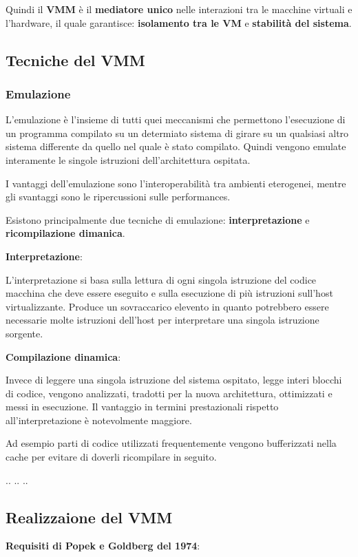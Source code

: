 \documentclass{article}
\begin{document}
Quindi il \textbf{VMM} è il \textbf{mediatore unico} nelle interazioni tra le macchine virtuali e
l'hardware, il quale garantisce: \textbf{isolamento tra le VM} e \textbf{stabilità del sistema}.

\subsection{Tecniche del VMM}
\subsubsection{Emulazione}
L'emulazione è l'insieme di tutti quei meccanismi che permettono l'esecuzione di un programma compilato su un determiato sistema di girare su un qualsiasi altro sistema differente da quello nel quale è stato compilato.
Quindi vengono emulate interamente le singole istruzioni dell'architettura ospitata.

I vantaggi dell'emulazione sono l'interoperabilità tra ambienti eterogenei, mentre gli svantaggi sono le ripercussioni sulle performances.

\vspace{5mm}
Esistono principalmente due tecniche di emulazione: \textbf{interpretazione} e \textbf{ricompilazione dimanica}.

\vspace{5mm}
\textbf{Interpretazione}:

L'interpretazione si basa sulla lettura di ogni singola istruzione del codice macchina che deve essere eseguito e sulla esecuzione di più istruzioni sull'host virtualizzante.
Produce un sovraccarico elevento in quanto potrebbero essere necessarie molte istruzioni dell'host per interpretare una singola istruzione sorgente.

\vspace{5mm}
\textbf{Compilazione dinamica}:

Invece di leggere una singola istruzione del sistema ospitato, legge interi blocchi di codice, vengono analizzati, tradotti per la nuova architettura, ottimizzati e messi in esecuzione.
Il vantaggio in termini prestazionali rispetto all'interpretazione è notevolmente maggiore.

Ad esempio parti di codice utilizzati frequentemente vengono bufferizzati nella cache per evitare di doverli ricompilare in seguito.


..
..
..


\subsection{Realizzaione del VMM}
\textbf{Requisiti di Popek e Goldberg del 1974}:
\end{document}
